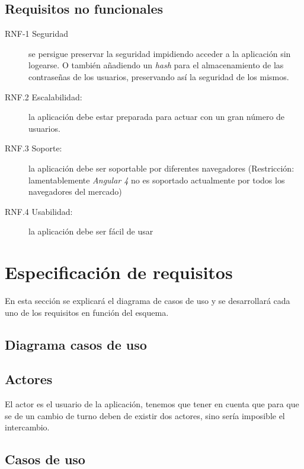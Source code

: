 \subsection{Requisitos no funcionales}\label{rnofuncionales}
\begin{description}
    \item [RNF-1 Seguridad] se persigue preservar la seguridad impidiendo acceder a la aplicación sin logearse. O también añadiendo un \emph{hash} para el almacenamiento de las contraseñas de los usuarios, preservando así la seguridad de los mismos.
    \item [RNF.2 Escalabilidad:] la aplicación debe estar preparada para actuar con un gran número de usuarios.
    \item [RNF.3 Soporte:]  la aplicación debe ser soportable por diferentes navegadores (Restricción: lamentablemente \emph{Angular 4} no es soportado actualmente por todos los navegadores del mercado)
    \item [RNF.4 Usabilidad:]  la aplicación debe ser fácil de usar 
\end{description}


\section{Especificación de requisitos}\label{requisitos}

En esta sección se explicará el diagrama de casos de uso y se desarrollará cada uno de los requisitos en función del esquema.

\subsection{Diagrama casos de uso}


\subsection{Actores}
El actor es el usuario de la aplicación, tenemos que tener en cuenta que para que se de un cambio de turno deben de existir dos actores, sino sería imposible el intercambio.

\subsection{Casos de uso}

